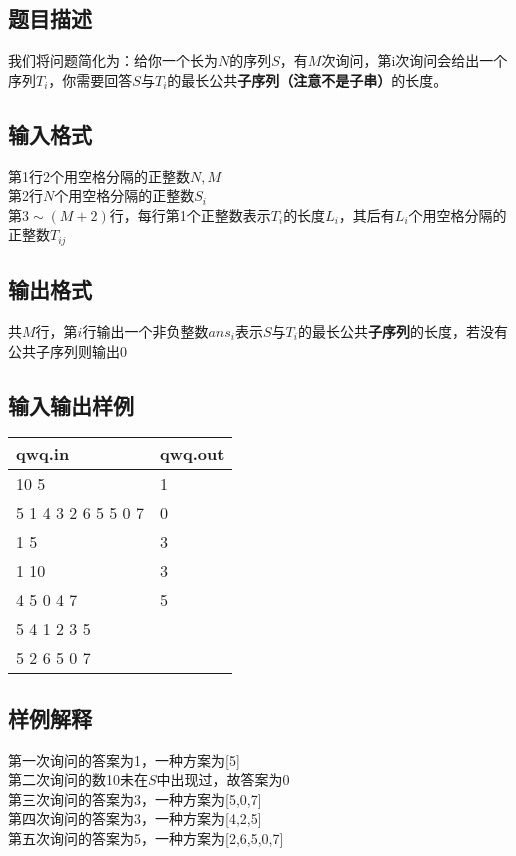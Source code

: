 \documentclass[12pt]{ctexart}
\begin{document}
\subsection{题目描述}
我们将问题简化为：给你一个长为$N$的序列$S$，有$M$次询问，第i次询问会给出一个序列$T_i$，你需要回答$S$与$T_i$的最长公共\textbf{子序列（注意不是子串）}的长度。
\subsection{输入格式}
\noindent 第1行2个用空格分隔的正整数$N,M$\\
第2行$N$个用空格分隔的正整数$S_i$\\
第$3\sim(M+2)$行，每行第1个正整数表示$T_i$的长度$L_i$，其后有$L_i$个用空格分隔的正整数$T_{ij}$
\subsection{输出格式}
共$M$行，第$i$行输出一个非负整数$ans_i$表示$S$与$T_i$的最长公共\textbf{子序列}的长度，若没有公共子序列则输出0
\subsection{输入输出样例}
\begin{tabular}{|p{6cm}|p{6cm}|}
	\hline qwq.in&qwq.out\\
	\hline  10 5&1\\
			5 1 4 3 2 6 5 5 0 7&0\\
			1 5&3\\
			1 10&3\\
			4 5 0 4 7&5\\
			5 4 1 2 3 5&\\
			5 2 6 5 0 7&\\
	\hline
\end{tabular}
\subsection{样例解释}
\noindent 第一次询问的答案为1，一种方案为[5]\\
第二次询问的数10未在$S$中出现过，故答案为0\\
第三次询问的答案为3，一种方案为[5,0,7]\\
第四次询问的答案为3，一种方案为[4,2,5]\\
第五次询问的答案为5，一种方案为[2,6,5,0,7]
\end{document}
